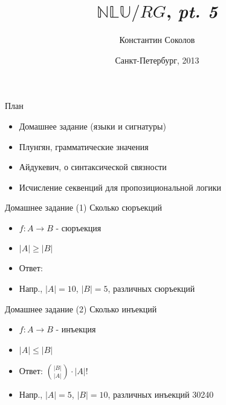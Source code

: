 \documentclass{beamer}
\begin{document}
\title{\huge{$\mathbb{NLU}/RG$, \textit{pt. 5}}}
\author{Константин Соколов}
\date{Санкт-Петербург, 2013} 
\begin{frame}
    \thispagestyle{empty}
    \titlepage
\end{frame}

\begin{frame}{План}
    \setcounter{framenumber}{1}
    \begin{itemize}
        \item Домашнее задание (языки и сигнатуры)
        \item Плунгян, грамматические значения
        \item Айдукевич, о синтаксической связности
        \item Исчисление секвенций для пропозициональной логики
    \end{itemize}
\end{frame}

\begin{frame}{Домашнее задание (1)}
Сколько сюръекций\\
  \begin{itemize}
    \item $f : A \to B$ - сюръекция
    \item $\left\vert{A}\right\vert \geq \left\vert{B}\right\vert$
    \item Ответ: 
    \item Напр., $\left\vert{A}\right\vert = 10$, $\left\vert{B}\right\vert = 5$, различных сюръекций 
  \end{itemize}  
\end{frame}

\begin{frame}{Домашнее задание (2)}
Сколько инъекций\\
  \begin{itemize}
    \item $f : A \to B$ - инъекция
    \item $\left\vert{A}\right\vert \leq \left\vert{B}\right\vert$
    \item Ответ: ${\left\vert{B}\right\vert \choose \left\vert{A}\right\vert} \cdot \left\vert{A}\right\vert!$
    \item Напр., $\left\vert{A}\right\vert = 5$, $\left\vert{B}\right\vert = 10$, различных инъекций 30240 
  \end{itemize}  
\end{frame}
\end{document}
